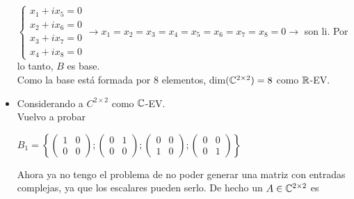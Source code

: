 \begin{mdframed}[style=s]
\begin{itemize}
                $\begin{cases}
                    x_1+ix_5=0\\
                    x_2+ix_6=0\\
                    x_3+ix_7=0\\
                    x_4+ix_8=0
                \end{cases}\to x_1=x_2=x_3=x_4=x_5=x_6=x_7=x_8=0\to$ son li. Por lo tanto, $B$ es base.\\
                Como la base está formada por 8 elementos, dim$(\mathbb{C}^{2\times2})=8$ como $\mathbb{R}$-EV.
            \item Considerando a $C^{2\times2}$ como $\mathbb{C}$-EV.\\
                Vuelvo a probar 
                \begin{center}
                    $B_1=\left\{\begin{pmatrix}
                        1&0\\0&0
                    \end{pmatrix};\begin{pmatrix}
                        0&1\\0&0
                    \end{pmatrix};\begin{pmatrix}
                        0&0\\1&0
                    \end{pmatrix};\begin{pmatrix}
                        0&0\\0&1
                    \end{pmatrix}\right\}$    
                \end{center}
                Ahora ya no tengo el problema de no poder generar una matriz con entradas complejas, ya que los escalares pueden serlo. De hecho un $A\in\mathbb{C}^{2\times2}$ es 
\end{itemize}
\end{mdframed}
